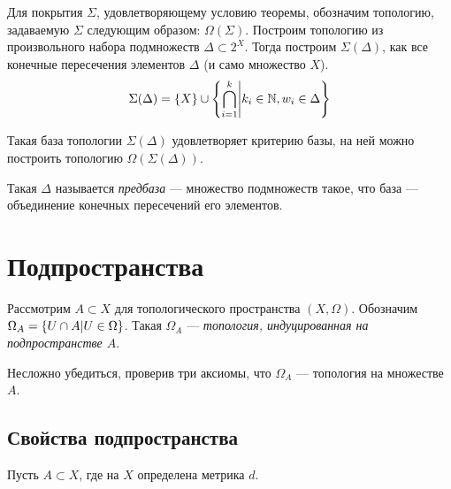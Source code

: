 \documentclass[a4paper]{report}
\begin{document}
    Для покрытия $\Sigma$, удовлетворяющему условию теоремы, обозначим топологию, задаваемую $\Sigma$ следующим образом: $\Omega(\Sigma)$.
    \ok
    Построим топологию из произвольного набора подмножеств $\Delta \subset 2^X$.
    Тогда построим $\Sigma(\Delta)$, как все конечные пересечения элементов $\Delta$ (и само множество $X$).
    \[\Sigma(\Delta) = \{X\} \cup \left\{\bigcap\limits_{i = 1}^{k}\middle|k_i \in \mathbb{N}, w_i \in \Delta\right\}\]

    Такая база топологии $\Sigma(\Delta)$ удовлетворяет критерию базы, на ней можно построить топологию $\Omega(\Sigma(\Delta))$.

    Такая $\Delta$ называется \textit{предбаза} --- множество подмножеств такое, что база --- объединение конечных пересечений его элементов.


    \section{Подпространства}
    Рассмотрим $A \subset X$ для топологического пространства $(X, \Omega)$.
    Обозначим $\Omega_A = \left\{U \cap A\middle|U \in \Omega\right\}$.
    Такая $\Omega_A$ --- \textit{топология, индуцированная на подпространстве $A$}.

    Несложно убедиться, проверив три аксиомы, что $\Omega_A$ --- топология на множестве $A$.

    \subsection{Свойства подпространства}
    Пусть $A \subset X$, где на $X$ определена метрика $d$.
\end{document}
